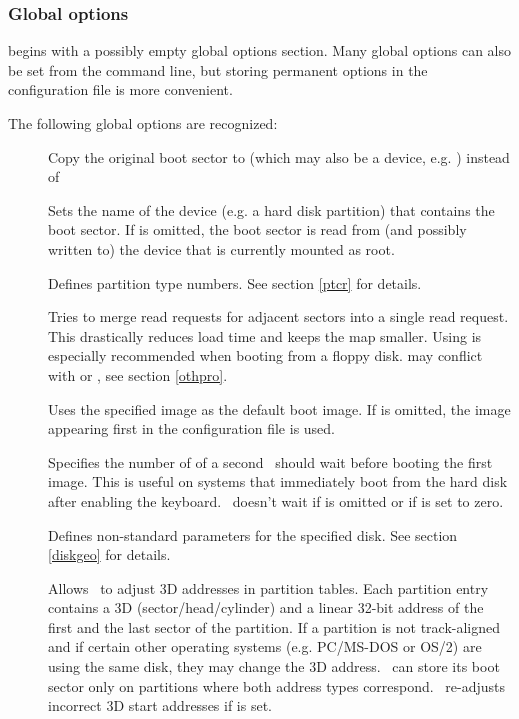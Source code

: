 \subsubsection{Global options}
\label{cfgglo}

 begins with a possibly empty global options section.
Many global options can also be set from the command line, but storing
permanent options in the configuration file is more convenient.

The following global options are recognized:

\begin{description}
  \item[] Copy the original boot sector to
     (which may also be a device, e.g. )
    instead of 
  \item[] Sets the name of the device (e.g.
    a hard disk partition) that contains
    the boot sector. If  is omitted, the boot sector is read from
    (and possibly written to) the device that is currently mounted as root.
  \item[] Defines partition type numbers. See section
    \ref{ptcr} for details.
  \item[] Tries to merge read requests for adjacent sectors into
    a single read request. This drastically reduces load time and keeps the
    map smaller. Using  is especially recommended when booting
    from a floppy disk.
     may conflict with  or , see
    section \ref{othpro}.
  \item[] Uses the specified image as the default
    boot image. If  is omitted, the image appearing first in the
    configuration file is used.
  \item[] Specifies the number of 
    of a second
    \LILO\ should wait before booting the first image. This is useful on
    systems that immediately boot from the hard disk after enabling the
    keyboard. \LILO\ doesn't wait if  is omitted or if 
    is set to zero.
  \item[] Defines non-standard parameters
    for the specified disk. See section \ref{diskgeo} for details.
  \item[]\label{fix-table}Allows \LILO\ to adjust 3D addresses
    in partition
    tables. Each partition entry contains a 3D (sector/head/cylinder) and a
    linear 32-bit address of the first and the last sector of the partition.
    If a
    partition is not track-aligned and if certain other operating systems
    (e.g. PC/MS-DOS or OS/2) are using the same disk, they may change the 3D
    address. \LILO\ can store its boot sector only on partitions where both
    address types correspond. \LILO\ re-adjusts incorrect 3D start addresses
    if  is set.


\end{description}

